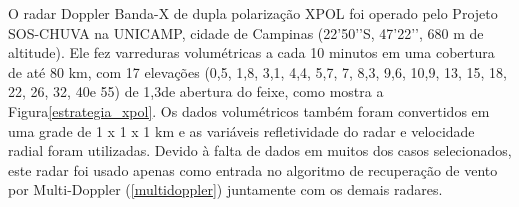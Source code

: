 O radar Doppler Banda-X de dupla polarização XPOL foi operado pelo Projeto SOS-CHUVA na UNICAMP, cidade de Campinas (22’50’’S, 47’22’’, 680 m de altitude). Ele fez varreduras volumétricas a cada 10 minutos em uma cobertura de até 80 km, com 17 elevações (0,5\textdegree, 1,8\textdegree, 3,1\textdegree, 4,4\textdegree, 5,7\textdegree, 7\textdegree, 8,3\textdegree, 9,6\textdegree, 10,9\textdegree, 13\textdegree, 15\textdegree, 18\textdegree, 22\textdegree, 26\textdegree, 32\textdegree, 40\textdegree e 55\textdegree) de 1,3\textdegree de abertura do feixe, como mostra a Figura\autoref{estrategia_xpol}. Os dados volumétricos também foram convertidos em uma grade de 1 x 1 x 1 km e as variáveis refletividade do radar e velocidade radial foram utilizadas. Devido à falta de dados em muitos dos casos selecionados, este radar foi usado apenas como entrada no algoritmo de recuperação de vento por Multi-Doppler (\autoref{multidoppler}) juntamente com os demais radares.

